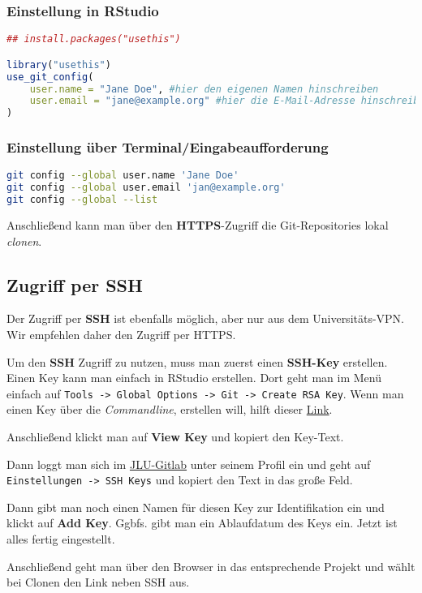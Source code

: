 \documentclass[11pt,a4paper]{article}
\begin{document}
\subsubsection*{Einstellung in RStudio}
\begin{lstlisting}[language=R]
## install.packages("usethis")

library("usethis")
use_git_config(
	user.name = "Jane Doe", #hier den eigenen Namen hinschreiben
	user.email = "jane@example.org" #hier die E-Mail-Adresse hinschreiben, die in gitlab hinterlegt ist
)
\end{lstlisting}

\subsubsection*{Einstellung über Terminal/Eingabeaufforderung}
\begin{lstlisting}[language=bash]
git config --global user.name 'Jane Doe'
git config --global user.email 'jan@example.org'
git config --global --list
\end{lstlisting}

Anschließend kann man über den \textbf{HTTPS}-Zugriff die Git-Repositories lokal \textit{clonen}. 

\subsection*{Zugriff per SSH}
Der Zugriff per \textbf{SSH} ist ebenfalls möglich, aber nur aus dem Universitäts-VPN. Wir empfehlen daher den Zugriff per HTTPS.

Um den \textbf{SSH} Zugriff zu nutzen, muss man zuerst einen \textbf{SSH-Key} erstellen. Einen Key kann man einfach in RStudio erstellen. Dort geht man im Menü einfach auf \texttt{Tools -> Global Options -> Git -> Create RSA Key}. Wenn man einen Key über die \textit{Commandline}, erstellen will, hilft dieser \href{https://www.heise.de/tipps-tricks/SSH-Key-erstellen-so-geht-s-4400280.html}{Link}.

Anschließend klickt man auf \textbf{View Key} und kopiert den Key-Text. 

Dann loggt man sich im \href{https://gitlab.ub.uni-giessn.de}{JLU-Gitlab} unter seinem Profil ein und geht auf \texttt{Einstellungen -> SSH Keys} und kopiert den Text in das große Feld.

Dann gibt man noch einen Namen für diesen Key zur Identifikation ein und klickt auf \textbf{Add Key}. Ggbfs. gibt man ein Ablaufdatum des Keys ein. Jetzt ist alles fertig eingestellt.

Anschließend geht man über den Browser in das entsprechende Projekt und wählt bei Clonen den Link neben SSH aus.
\end{document}
